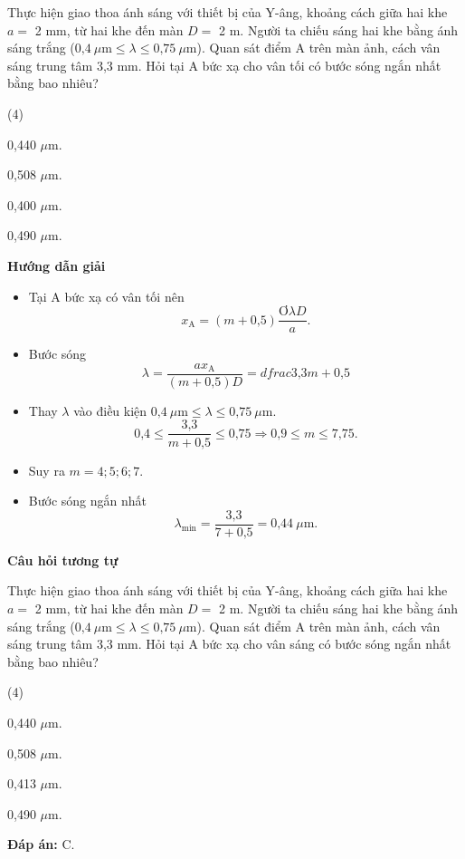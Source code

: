 {Thực hiện giao thoa ánh sáng với thiết bị của Y-âng, khoảng cách giữa hai khe $a =$ 2 mm, từ hai khe đến màn $D =$ 2 m. Người ta chiếu sáng hai khe bằng ánh sáng trắng ($\text{0,4}\ \mu \text{m} \leq  \lambda \leq  \text{0,75}\ \mu \text{m}$). Quan sát điểm A trên màn ảnh, cách vân sáng trung tâm 3,3 mm. Hỏi tại A bức xạ cho vân tối có bước sóng ngắn nhất bằng bao nhiêu?
	\begin{mcq}(4)
		\item 0,440 $\mu$m.		
		\item 0,508 $\mu$m.			
		\item 0,400 $\mu$m.			
		\item 0,490 $\mu$m.
	\end{mcq}
}
{\begin{center}
		\textbf{Hướng dẫn giải}
	\end{center}
	
	\begin{itemize}
		\item Tại A bức xạ có vân tối nên 
		\begin{equation*}
			x_{\text{A}} =(m+\text{0,5})\dfrac{Ơ\lambda D}{a}.
		\end{equation*}
		\item Bước sóng 
		\begin{equation*}
			\lambda=\dfrac{a x_{\text{A}}}{(m+\text{0,5})D} = dfrac{\text{3,3}}{m+\text{0,5}}
		\end{equation*}
		\item Thay $\lambda$ vào điều kiện $\text{0,4}\ \mu \text{m} \leq  \lambda \leq  \text{0,75}\ \mu \text{m}$.
		\begin{equation*}
			\text{0,4} \leq  \dfrac{\text{3,3}}{m+\text{0,5}} \leq  \text{0,75} \Rightarrow \text{0,9}\leq  m \leq  \text{7,75}.
		\end{equation*}
		
		\item Suy ra $m=4; 5; 6; 7$.
		\item Bước sóng ngắn nhất
		\begin{equation*}
			\lambda_{\text{min}}=\dfrac{\text{3,3}}{7+\text{0,5}}=\text{0,44}\ \mu \text{m}.
		\end{equation*}
	\end{itemize}
	
	\begin{center}
		\textbf{Câu hỏi tương tự}
	\end{center}
	
	Thực hiện giao thoa ánh sáng với thiết bị của Y-âng, khoảng cách giữa hai khe $a =$ 2 mm, từ hai khe đến màn $D =$ 2 m. Người ta chiếu sáng hai khe bằng ánh sáng trắng ($\text{0,4}\ \mu \text{m} \leq  \lambda \leq  \text{0,75}\ \mu \text{m}$). Quan sát điểm A trên màn ảnh, cách vân sáng trung tâm 3,3 mm. Hỏi tại A bức xạ cho vân sáng có bước sóng ngắn nhất bằng bao nhiêu?
	\begin{mcq}(4)
		\item 0,440 $\mu$m.		
		\item 0,508 $\mu$m.			
		\item 0,413 $\mu$m.			
		\item 0,490 $\mu$m.
	\end{mcq}
	
	\textbf{Đáp án:} C.
}
